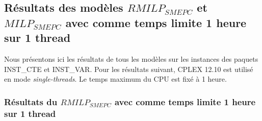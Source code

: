 {\subsection{Résultats des modèles $RMILP_{SMEPC}$ et $MILP_{SMEPC}$ avec comme temps limite 1 heure sur 1 thread}
Nous présentons ici les résultats de tous les modèles sur les instances des paquets INST\_CTE et INST\_VAR.  Pour les résultats suivant, CPLEX 12.10 est utilisé en mode \textit{single-threads}. 
 Le temps maximum du CPU est fixé à 1 heure.


\subsubsection{Résultats du \textit{$RMILP_{SMEPC}$} avec comme temps limite 1 heure sur 1 thread }

}
